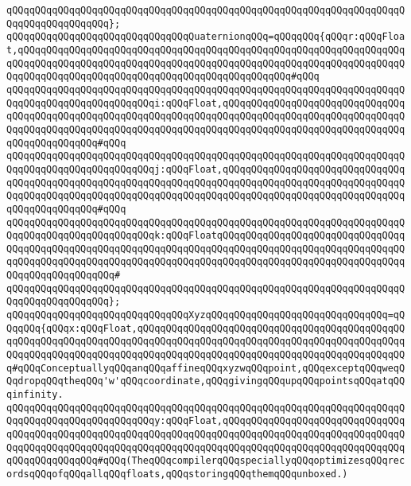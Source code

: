 \verb|qQQqqQQqqQQqqQQqqQQqqQQqqQQqqQQqqQQqqQQqqQQqqQQqqQQqqQQqqQQqqQQqqQQqqQQqqQQqqQQqqQQqqQQq};|\newline
\verb|qQQqqQQqqQQqqQQqqQQqqQQqqQQqqQQqQuaternionqQQq=qQQqqQQq{qQQqr:qQQqFloat,qQQqqQQqqQQqqQQqqQQqqQQqqQQqqQQqqQQqqQQqqQQqqQQqqQQqqQQqqQQqqQQqqQQqqQQqqQQqqQQqqQQqqQQqqQQqqQQqqQQqqQQqqQQqqQQqqQQqqQQqqQQqqQQqqQQqqQQqqQQqqQQqqQQqqQQqqQQqqQQqqQQqqQQqqQQqqQQqqQQqqQQqqQQq#qQQq|\newline
\verb|qQQqqQQqqQQqqQQqqQQqqQQqqQQqqQQqqQQqqQQqqQQqqQQqqQQqqQQqqQQqqQQqqQQqqQQqqQQqqQQqqQQqqQQqqQQqqQQqi:qQQqFloat,qQQqqQQqqQQqqQQqqQQqqQQqqQQqqQQqqQQqqQQqqQQqqQQqqQQqqQQqqQQqqQQqqQQqqQQqqQQqqQQqqQQqqQQqqQQqqQQqqQQqqQQqqQQqqQQqqQQqqQQqqQQqqQQqqQQqqQQqqQQqqQQqqQQqqQQqqQQqqQQqqQQqqQQqqQQqqQQqqQQqqQQqqQQq#qQQq|\newline
\verb|qQQqqQQqqQQqqQQqqQQqqQQqqQQqqQQqqQQqqQQqqQQqqQQqqQQqqQQqqQQqqQQqqQQqqQQqqQQqqQQqqQQqqQQqqQQqqQQqj:qQQqFloat,qQQqqQQqqQQqqQQqqQQqqQQqqQQqqQQqqQQqqQQqqQQqqQQqqQQqqQQqqQQqqQQqqQQqqQQqqQQqqQQqqQQqqQQqqQQqqQQqqQQqqQQqqQQqqQQqqQQqqQQqqQQqqQQqqQQqqQQqqQQqqQQqqQQqqQQqqQQqqQQqqQQqqQQqqQQqqQQqqQQqqQQqqQQq#qQQq|\newline
\verb|qQQqqQQqqQQqqQQqqQQqqQQqqQQqqQQqqQQqqQQqqQQqqQQqqQQqqQQqqQQqqQQqqQQqqQQqqQQqqQQqqQQqqQQqqQQqqQQqk:qQQqFloatqQQqqQQqqQQqqQQqqQQqqQQqqQQqqQQqqQQqqQQqqQQqqQQqqQQqqQQqqQQqqQQqqQQqqQQqqQQqqQQqqQQqqQQqqQQqqQQqqQQqqQQqqQQqqQQqqQQqqQQqqQQqqQQqqQQqqQQqqQQqqQQqqQQqqQQqqQQqqQQqqQQqqQQqqQQqqQQqqQQqqQQqqQQqqQQq#|\newline
\verb|qQQqqQQqqQQqqQQqqQQqqQQqqQQqqQQqqQQqqQQqqQQqqQQqqQQqqQQqqQQqqQQqqQQqqQQqqQQqqQQqqQQqqQQq};|\newline
\verb|qQQqqQQqqQQqqQQqqQQqqQQqqQQqqQQqXyzqQQqqQQqqQQqqQQqqQQqqQQqqQQqqQQq=qQQqqQQq{qQQqx:qQQqFloat,qQQqqQQqqQQqqQQqqQQqqQQqqQQqqQQqqQQqqQQqqQQqqQQqqQQqqQQqqQQqqQQqqQQqqQQqqQQqqQQqqQQqqQQqqQQqqQQqqQQqqQQqqQQqqQQqqQQqqQQqqQQqqQQqqQQqqQQqqQQqqQQqqQQqqQQqqQQqqQQqqQQqqQQqqQQqqQQqqQQqqQQqqQQq#qQQqConceptuallyqQQqanqQQqaffineqQQqxyzwqQQqpoint,qQQqexceptqQQqweqQQqdropqQQqtheqQQq'w'qQQqcoordinate,qQQqgivingqQQqupqQQqpointsqQQqatqQQqinfinity.|\newline
\verb|qQQqqQQqqQQqqQQqqQQqqQQqqQQqqQQqqQQqqQQqqQQqqQQqqQQqqQQqqQQqqQQqqQQqqQQqqQQqqQQqqQQqqQQqqQQqqQQqy:qQQqFloat,qQQqqQQqqQQqqQQqqQQqqQQqqQQqqQQqqQQqqQQqqQQqqQQqqQQqqQQqqQQqqQQqqQQqqQQqqQQqqQQqqQQqqQQqqQQqqQQqqQQqqQQqqQQqqQQqqQQqqQQqqQQqqQQqqQQqqQQqqQQqqQQqqQQqqQQqqQQqqQQqqQQqqQQqqQQqqQQqqQQqqQQqqQQq#qQQq(TheqQQqcompilerqQQqspeciallyqQQqoptimizesqQQqrecordsqQQqofqQQqallqQQqfloats,qQQqstoringqQQqthemqQQqunboxed.)|\newline
